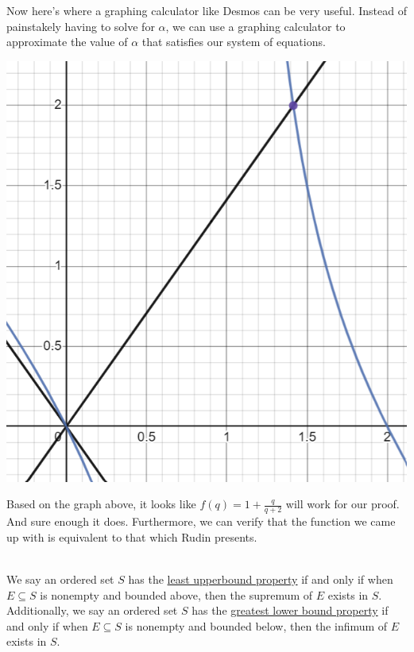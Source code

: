 \documentclass{book}
\newcommand{\hOneOld}{%
   \color{Black}%
   \fontsize{14}{14}\selectfont%
}
\newenvironment{myIndent}{%
   \begin{adjustwidth}{2.5em}{0em}%
}{%
   \end{adjustwidth}%
}
\newcommand{\udefine}[1]{%
   \setulcolor{Red}%
   \setul{0.14em}{0.07em}%
   \ul{#1}%
}
\newcommand{\mySepOne}[1]{%
   {\noindent\color{#1}{\rule{6.5in}{1mm}}}\\%
}
\begin{document}
\begin{itemize}
\begin{myIndent}
         Now here's where a graphing calculator like Desmos can be very
         useful. Instead of painstakely having to solve for $\alpha$,
         we can use a graphing calculator to approximate the value of
         $\alpha$ that satisfies our system of equations.
         \begin{center}
         \includegraphics[scale=0.75]{Finding_Equation_Demonstration_1.png}
         \end{center}

         Based on the graph above, it looks like $f(q) = 1 +
         \frac{q}{q + 2}$ will work for our proof. And sure enough 
         it does. Furthermore, we can verify that the function we came
         up with is equivalent to that which Rudin presents.
      \end{myIndent}
   \end{itemize}

   \mySepOne{Purple}
   \hOneOld\hfill \break
   We say an ordered set $S$ has the \udefine{least upperbound
   property} if and only if when $E \subseteq S$ is nonempty and 
   bounded above, then the supremum of $E$ exists in $S$. Additionally, 
   we say an ordered set $S$ has the \udefine{greatest lower bound 
   property} if and only if when $E \subseteq S$ is nonempty and 
   bounded below, then the infimum of $E$ exists in $S$.
   
\end{document}

